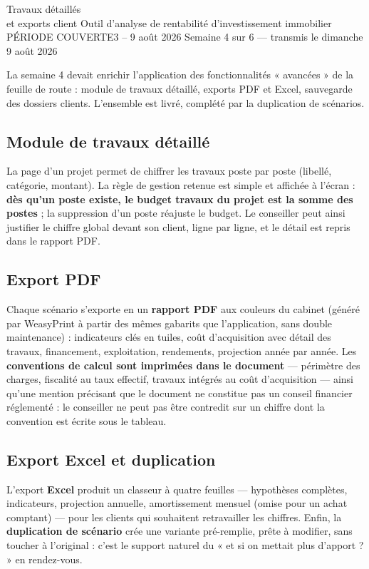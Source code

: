 \documentclass[11pt,a4paper]{article}
\begin{document}
	{Travaux détaillés \\ et exports client}
	{Outil d'analyse de rentabilité d'investissement immobilier}
	{PÉRIODE COUVERTE}{3 -- 9 août 2026}
	{Semaine 4 sur 6 — transmis le dimanche 9 août 2026}


La semaine 4 devait enrichir l'application des fonctionnalités « avancées » de la feuille de route : module de travaux détaillé, exports PDF et Excel, sauvegarde des dossiers clients. L'ensemble est livré, complété par la duplication de scénarios.

\subsection{Module de travaux détaillé}
La page d'un projet permet de chiffrer les travaux poste par poste (libellé, catégorie, montant). La règle de gestion retenue est simple et affichée à l'écran : \textbf{dès qu'un poste existe, le budget travaux du projet est la somme des postes} ; la suppression d'un poste réajuste le budget. Le conseiller peut ainsi justifier le chiffre global devant son client, ligne par ligne, et le détail est repris dans le rapport PDF.

\subsection{Export PDF}
Chaque scénario s'exporte en un \textbf{rapport PDF} aux couleurs du cabinet (généré par WeasyPrint à partir des mêmes gabarits que l'application, sans double maintenance) : indicateurs clés en tuiles, coût d'acquisition avec détail des travaux, financement, exploitation, rendements, projection année par année. Les \textbf{conventions de calcul sont imprimées dans le document} — périmètre des charges, fiscalité au taux effectif, travaux intégrés au coût d'acquisition — ainsi qu'une mention précisant que le document ne constitue pas un conseil financier réglementé : le conseiller ne peut pas être contredit sur un chiffre dont la convention est écrite sous le tableau.

\subsection{Export Excel et duplication}
L'export \textbf{Excel} produit un classeur à quatre feuilles — hypothèses complètes, indicateurs, projection annuelle, amortissement mensuel (omise pour un achat comptant) — pour les clients qui souhaitent retravailler les chiffres. Enfin, la \textbf{duplication de scénario} crée une variante pré-remplie, prête à modifier, sans toucher à l'original : c'est le support naturel du « et si on mettait plus d'apport ? » en rendez-vous.
\end{document}
